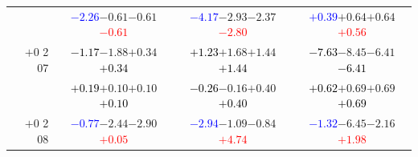 \documentclass[compress]{beamer}
\begin{document}
\begin{frame}
\begin{tabular}{r | c | c | c}
          & \textcolor{blue}{$-2.26$}\hspace{0.1 cm}$-0.61$\hspace{0.1 cm}$-0.61$\hspace{0.1 cm}\textcolor{red}{$-0.61$} & \textcolor{blue}{$-4.17$}\hspace{0.1 cm}$-2.93$\hspace{0.1 cm}$-2.37$\hspace{0.1 cm}\textcolor{red}{$-2.80$} & \textcolor{blue}{$+0.39$}\hspace{0.1 cm}$+0.64$\hspace{0.1 cm}$+0.64$\hspace{0.1 cm}\textcolor{red}{$+0.56$} \\
$+$0 2 07 & \textcolor{black}{$-1.17$}\hspace{0.1 cm}$-1.88$\hspace{0.1 cm}$+0.34$\hspace{0.1 cm}\textcolor{black}{$+0.34$} & \textcolor{black}{$+1.23$}\hspace{0.1 cm}$+1.68$\hspace{0.1 cm}$+1.44$\hspace{0.1 cm}\textcolor{black}{$+1.44$} & \textcolor{black}{$-7.63$}\hspace{0.1 cm}$-8.45$\hspace{0.1 cm}$-6.41$\hspace{0.1 cm}\textcolor{black}{$-6.41$} \\
          & \textcolor{black}{$+0.19$}\hspace{0.1 cm}$+0.10$\hspace{0.1 cm}$+0.10$\hspace{0.1 cm}\textcolor{black}{$+0.10$} & \textcolor{black}{$-0.26$}\hspace{0.1 cm}$-0.16$\hspace{0.1 cm}$+0.40$\hspace{0.1 cm}\textcolor{black}{$+0.40$} & \textcolor{black}{$+0.62$}\hspace{0.1 cm}$+0.69$\hspace{0.1 cm}$+0.69$\hspace{0.1 cm}\textcolor{black}{$+0.69$} \\
$+$0 2 08 & \textcolor{blue}{$-0.77$}\hspace{0.1 cm}$-2.44$\hspace{0.1 cm}$-2.90$\hspace{0.1 cm}\textcolor{red}{$+0.05$} & \textcolor{blue}{$-2.94$}\hspace{0.1 cm}$-1.09$\hspace{0.1 cm}$-0.84$\hspace{0.1 cm}\textcolor{red}{$+4.74$} & \textcolor{blue}{$-1.32$}\hspace{0.1 cm}$-6.45$\hspace{0.1 cm}$-2.16$\hspace{0.1 cm}\textcolor{red}{$+1.98$} \\

\end{tabular}
\end{frame}
\end{document}

